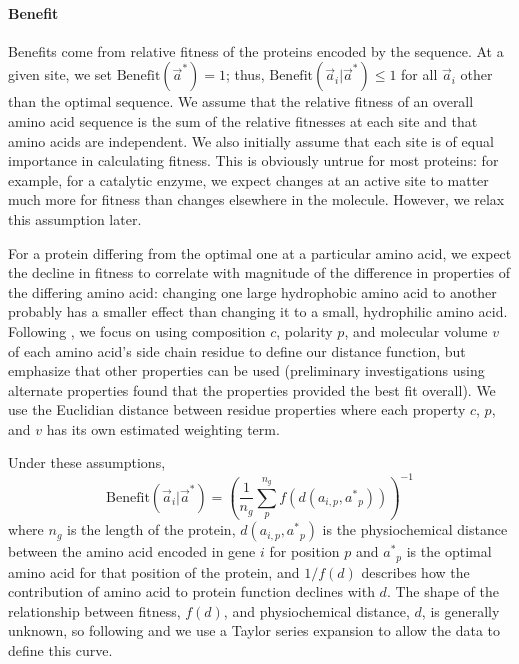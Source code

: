 \documentclass{article}
\newcommand{\aip}{\ensuremath{a_{i,p}}\xspace}
\newcommand{\aveci}{\ensuremath{\Vec{a}_i}\xspace}
\newcommand{\aopt}{\ensuremath{a^*}\xspace}
\newcommand{\aoptp}{\ensuremath{\aopt_p}\xspace}
\newcommand{\aoptvec}{\ensuremath{\Vec{a}^*}\xspace}
\newcommand{\Func}{\ensuremath{\text{Benefit}}\xspace}
\newcommand{\Funcaveci}{\ensuremath{\Func(\aveci|\aoptvec)}\xspace}
\newcommand{\Funcaoptvec}{\ensuremath{\Func(\aoptvec)}\xspace}
\renewcommand{\ng}{\ensuremath{{n_g}}\xspace}
\begin{document}
\paragraph*{Benefit}
Benefits come from relative fitness of the proteins encoded by the sequence.
At a given site,  we set $\Funcaoptvec = 1$; thus, $\Funcaveci \leqslant 1$ for all $\aveci$ other than the optimal sequence. %
We assume that the relative fitness of an overall amino acid sequence is the sum of the relative fitnesses at each site and that amino acids are independent.
We also initially assume that each site is of equal importance in calculating fitness.
This is obviously untrue for most proteins: for example, for a catalytic enzyme, we expect changes at an active site to matter much more for fitness than changes elsewhere in the molecule.
However, we relax this assumption later. %

For a protein differing from the optimal one at a particular amino acid, we expect the decline in fitness to correlate with magnitude of the difference in properties of the differing amino acid: changing one large hydrophobic amino acid to another probably has a smaller effect than changing it to a small, hydrophilic amino acid. 
Following \citet{Grantham74}, we focus on using composition $c$, polarity $p$, and molecular volume $v$ of each amino acid's side chain residue to define our distance function, but emphasize that other properties can be used (preliminary investigations using alternate properties found that the \citet{Grantham74} properties provided the best fit overall).
We use the Euclidian distance between residue properties where each property $c$, $p$, and $v$ has its own estimated weighting term.

Under these assumptions, 
\begin{equation}
\Funcaveci = \left(\frac{1}{\ng} \sum_p^\ng{} f\left(d\left(\aip, \aoptp\right)\right)\right)^{-1}
\end{equation}
where $\ng$ is the length of the protein, $d(\aip, \aoptp)$ is the physiochemical distance between the amino acid encoded in gene $i$ for position $p$ and $\aoptp$ is the optimal amino acid for that position of the protein, and $1/f(d)$ describes how the contribution of amino acid to protein function declines with $d$.
The shape of the relationship between fitness, $f(d)$, and physiochemical distance, $d$, is generally unknown, so following \citet{Liang07} and \citet{Elphinstone85} we use a Taylor series expansion to allow the data to define this curve.
\end{document}
